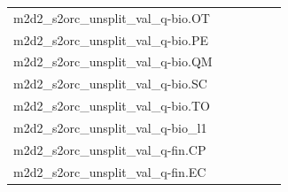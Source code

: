 \documentclass[dvipsnames]{article}
\begin{document}
\begin{appendix}
{\begin{longtable}{m{6cm}m{1.7cm}m{1.7cm}m{1.7cm}m{1.7cm}m{1.7cm}}
	m2d2\_s2orc\_unsplit\_val\_q-bio.OT  & \colorbox[HTML]{b8e293}{\makebox[\mywidth][c]{14.90}} & \colorbox[HTML]{c2e698}{\makebox[\mywidth][c]{14.94}} & \colorbox[HTML]{ffffe5}{\makebox[\mywidth][c]{17.16}} & \colorbox[HTML]{bde395}{\makebox[\mywidth][c]{14.92}} & \colorbox[HTML]{77c578}{\makebox[\mywidth][c]{14.73}}\\
	m2d2\_s2orc\_unsplit\_val\_q-bio.PE  & \colorbox[HTML]{bae294}{\makebox[\mywidth][c]{12.57}} & \colorbox[HTML]{dcf1a5}{\makebox[\mywidth][c]{12.71}} & \colorbox[HTML]{ffffe5}{\makebox[\mywidth][c]{14.62}} & \colorbox[HTML]{d7efa2}{\makebox[\mywidth][c]{12.69}} & \colorbox[HTML]{77c578}{\makebox[\mywidth][c]{12.41}}\\
	m2d2\_s2orc\_unsplit\_val\_q-bio.QM  & \colorbox[HTML]{a4d98a}{\makebox[\mywidth][c]{12.49}} & \colorbox[HTML]{ddf1a6}{\makebox[\mywidth][c]{12.69}} & \colorbox[HTML]{ffffe5}{\makebox[\mywidth][c]{14.44}} & \colorbox[HTML]{bbe395}{\makebox[\mywidth][c]{12.56}} & \colorbox[HTML]{77c578}{\makebox[\mywidth][c]{12.40}}\\
	m2d2\_s2orc\_unsplit\_val\_q-bio.SC  & \colorbox[HTML]{b8e293}{\makebox[\mywidth][c]{13.68}} & \colorbox[HTML]{e1f3a9}{\makebox[\mywidth][c]{13.85}} & \colorbox[HTML]{ffffe5}{\makebox[\mywidth][c]{15.60}} & \colorbox[HTML]{cdeb9d}{\makebox[\mywidth][c]{13.75}} & \colorbox[HTML]{77c578}{\makebox[\mywidth][c]{13.53}}\\
	m2d2\_s2orc\_unsplit\_val\_q-bio.TO  & \colorbox[HTML]{bde395}{\makebox[\mywidth][c]{13.49}} & \colorbox[HTML]{cae99c}{\makebox[\mywidth][c]{13.53}} & \colorbox[HTML]{ffffe5}{\makebox[\mywidth][c]{15.32}} & \colorbox[HTML]{bbe395}{\makebox[\mywidth][c]{13.48}} & \colorbox[HTML]{77c578}{\makebox[\mywidth][c]{13.33}}\\
	m2d2\_s2orc\_unsplit\_val\_q-bio\_l1  & \colorbox[HTML]{bfe596}{\makebox[\mywidth][c]{13.69}} & \colorbox[HTML]{e4f4ab}{\makebox[\mywidth][c]{13.87}} & \colorbox[HTML]{ffffe5}{\makebox[\mywidth][c]{15.75}} & \colorbox[HTML]{cdeb9d}{\makebox[\mywidth][c]{13.75}} & \colorbox[HTML]{77c578}{\makebox[\mywidth][c]{13.50}}\\
	m2d2\_s2orc\_unsplit\_val\_q-fin.CP  & \colorbox[HTML]{a2d889}{\makebox[\mywidth][c]{11.37}} & \colorbox[HTML]{e3f4aa}{\makebox[\mywidth][c]{11.61}} & \colorbox[HTML]{ffffe5}{\makebox[\mywidth][c]{13.36}} & \colorbox[HTML]{b2df90}{\makebox[\mywidth][c]{11.41}} & \colorbox[HTML]{77c578}{\makebox[\mywidth][c]{11.28}}\\
	m2d2\_s2orc\_unsplit\_val\_q-fin.EC  & \colorbox[HTML]{9fd688}{\makebox[\mywidth][c]{11.72}} & \colorbox[HTML]{d5eea1}{\makebox[\mywidth][c]{11.89}} & \colorbox[HTML]{ffffe5}{\makebox[\mywidth][c]{13.77}} & \colorbox[HTML]{b4e091}{\makebox[\mywidth][c]{11.77}} & \colorbox[HTML]{77c578}{\makebox[\mywidth][c]{11.63}}\\

\end{longtable}}
\end{appendix}
\end{document}
